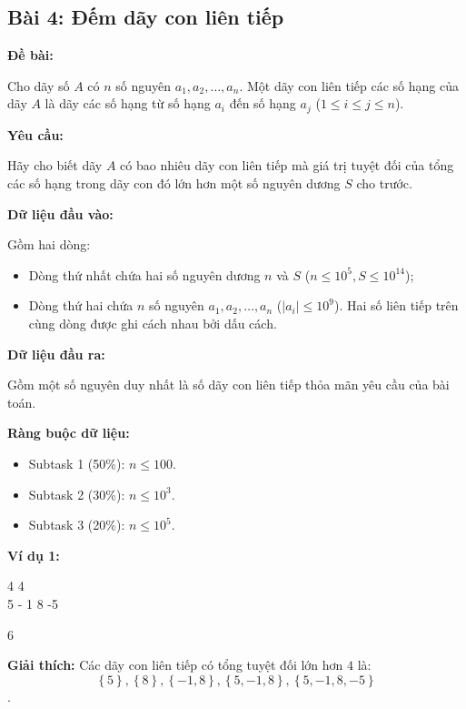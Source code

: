 \documentclass[12pt]{scrartcl}  %
\begin{document}
\subsection{Bài 4: Đếm dãy con liên tiếp}
\textbf{Đề bài:}

Cho dãy số $A$ có $n$ số nguyên $a_1, a_2, \ldots, a_n$. Một dãy con liên tiếp các số hạng của dãy $A$ là dãy các số hạng từ số hạng $a_i$ đến số hạng $a_j$ ($1 \leq i \leq j \leq n$).

\textbf{Yêu cầu:}

Hãy cho biết dãy $A$ có bao nhiêu dãy con liên tiếp mà giá trị tuyệt đối của tổng các số hạng trong dãy con đó lớn hơn một số nguyên dương $S$ cho trước.

\textbf{Dữ liệu đầu vào:}

Gồm hai dòng:
\begin{itemize}
    \item Dòng thứ nhất chứa hai số nguyên dương $n$ và $S$ ($n \leq 10^5, S \leq 10^{14}$);
    \item Dòng thứ hai chứa $n$ số nguyên $a_1, a_2, \ldots, a_n$ ($|a_i| \leq 10^9$). Hai số liên tiếp trên cùng dòng được ghi cách nhau bởi dấu cách.
\end{itemize}

\textbf{Dữ liệu đầu ra:}

Gồm một số nguyên duy nhất là số dãy con liên tiếp thỏa mãn yêu cầu của bài toán.

\textbf{Ràng buộc dữ liệu:}
\begin{itemize}
    \item Subtask 1 (50\%): $n \leq 100$.
    \item Subtask 2 (30\%): $n \leq 10^3$.
    \item Subtask 3 (20\%): $n \leq 10^5$.
\end{itemize}

\textbf{Ví dụ 1:}
\begin{tcolorbox}[colback=gray!5!white, colframe=blue!50!black, title=Input]
4 4\\
5 - 1 8 -5
\end{tcolorbox}
\begin{tcolorbox}[colback=gray!5!white, colframe=green!50!black, title=Output]
6
\end{tcolorbox}

\textbf{Giải thích:}
Các dãy con liên tiếp có tổng tuyệt đối lớn hơn $4$ là: $$\left\{5 \right\}, \left\{ 8 \right\}, \left\{ -1, 8 \right\}, \left\{ 5, -1, 8 \right\}, \left\{ 5, -1, 8, -5 \right\}$$.
\end{document}

